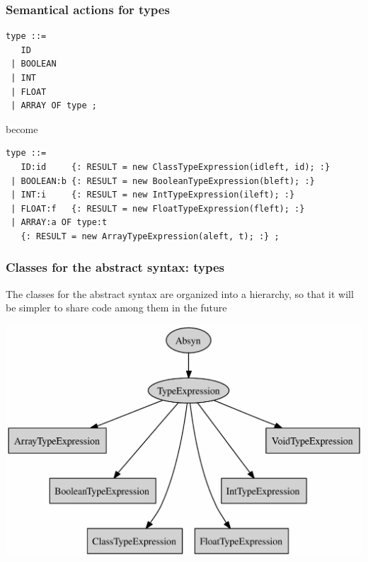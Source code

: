 \documentclass[11pt]{beamer}  %
\begin{document}
\begin{frame}[fragile]\frametitle{Semantical actions for types}

\vspace*{-2ex}
\begin{verbatim}
type ::=
   ID
 | BOOLEAN
 | INT
 | FLOAT
 | ARRAY OF type ;
\end{verbatim}

become

\begin{verbatim}
type ::=
   ID:id     {: RESULT = new ClassTypeExpression(idleft, id); :}
 | BOOLEAN:b {: RESULT = new BooleanTypeExpression(bleft); :}
 | INT:i     {: RESULT = new IntTypeExpression(ileft); :}
 | FLOAT:f   {: RESULT = new FloatTypeExpression(fleft); :}
 | ARRAY:a OF type:t
   {: RESULT = new ArrayTypeExpression(aleft, t); :} ;
\end{verbatim}

\end{frame}

\begin{frame}[fragile]\frametitle{Classes for the abstract syntax: types}

\begin{greenbox}{}
The classes for the abstract syntax are organized into a hierarchy,
so that it will be simpler to share code among them in the future
\end{greenbox}

\begin{center}
\includegraphics[scale=0.53]{pictures/types_hierarchy.pdf}
\end{center}

\end{frame}
\end{document}
